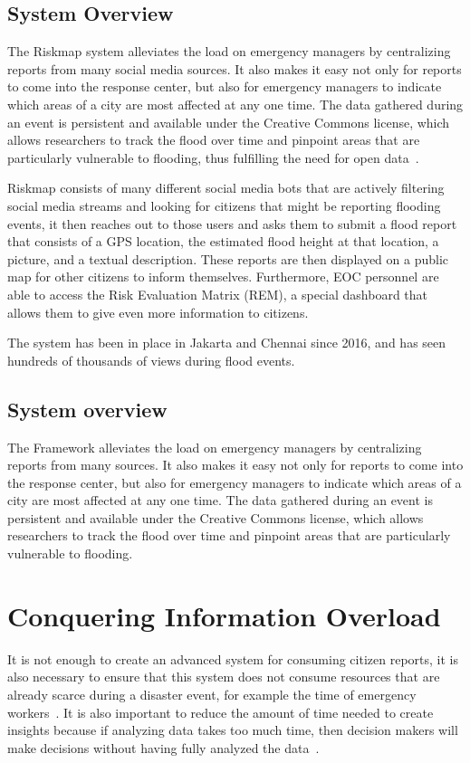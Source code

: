 	\subsection{System Overview}
	The Riskmap system alleviates the load on emergency managers by
	centralizing reports from many social media sources. It also makes it
	easy not only for reports to come into the response center, but also for
	emergency managers to indicate which areas of a city are most affected
	at any one time. The data gathered during an event is persistent and
	available under the Creative Commons license, which allows researchers
	to track the flood over time and pinpoint areas that are particularly
	vulnerable to flooding, thus fulfilling the need for open data~\cite{holdernessSocialMediaGeoSocial2015a}.

	Riskmap consists of many different social media bots that are actively
	filtering social media streams and looking for citizens that might be
	reporting flooding events, it then reaches out to those users and asks
	them to submit a flood report that consists of a GPS location, the
	estimated flood height at that location, a picture, and a textual
	description. These reports are then displayed on a public map for other
	citizens to inform themselves. Furthermore, EOC personnel are able to
	access the Risk Evaluation Matrix (REM), a special dashboard that allows
	them to give even more information to citizens.
	
	The system has been in place in Jakarta and Chennai since 2016, and has seen
	hundreds of thousands of views during flood events.

    \subsection{System overview}
    The  Framework alleviates the load on emergency managers by centralizing reports from many sources. It also makes it easy not only for reports to come into the response center, but also for emergency managers to indicate which areas of a city are most affected at any one time. The data gathered during an event is persistent and available under the Creative Commons license, which allows researchers to track the flood over time and pinpoint areas that are particularly vulnerable to flooding. 

\section{Conquering Information Overload}
	It is not enough to create an advanced system for consuming citizen
	reports, it is also necessary to ensure that this system does not
	consume resources that are already scarce during a disaster event, for
	example the time of emergency
	workers~\cite{aminDataNaturalDisasters2008}. It is also important to
	reduce the amount of time needed to create insights because if analyzing
	data takes too much time, then decision makers will make decisions
	without having fully analyzed the
	data~\cite{quarantelliUrbanVulnerabilityDisasters2003}.

